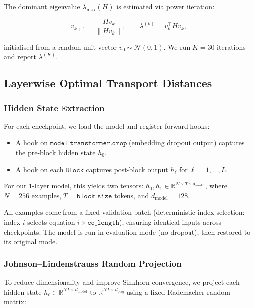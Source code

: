 \documentclass[12pt,twoside]{article}
\begin{document}
The dominant eigenvalue \(\lambda_{\max}(H)\) is estimated via power iteration:

\begin{equation}
  v_{k+1} = \frac{H v_k}{\|H v_k\|}, \qquad
  \lambda^{(k)} = v_k^\top H v_k,
  \label{eq:poweriter}
\end{equation}

initialised from a random unit vector \(v_0 \sim \mathcal{N}(0, 1)\). We run
\(K = 30\) iterations and report \(\lambda^{(K)}\).

\subsection{Layerwise Optimal Transport Distances}

\subsubsection{Hidden State Extraction}

For each checkpoint, we load the model and register forward hooks:

\begin{itemize}
  \item A hook on \(\texttt{model.transformer.drop}\) (embedding dropout
    output) captures the pre-block hidden state \(h_0\).
  \item A hook on each \(\texttt{Block}\) captures post-block output
    \(h_\ell\) for \(\ell = 1, \ldots, L\).
\end{itemize}

For our 1-layer model, this yields two tensors:
\(h_0, h_1 \in \mathbb{R}^{N \times T \times d_{\text{model}}}\),
where \(N = 256\) examples, \(T = \texttt{block\_size}\) tokens, and
\(d_{\text{model}} = 128\).

All examples come from a fixed validation batch (deterministic index
selection: index \(i\) selects equation \(i \times \texttt{eq\_length}\)),
ensuring identical inputs across checkpoints. The model is run in evaluation
mode (no dropout), then restored to its original mode.

\subsubsection{Johnson--Lindenstrauss Random Projection}

To reduce dimensionality and improve Sinkhorn convergence, we project each
hidden state \(h_\ell \in \mathbb{R}^{NT \times d_{\text{model}}}\) to
\(\mathbb{R}^{NT \times d_{\text{proj}}}\) using a fixed Rademacher random matrix:
\end{document}
